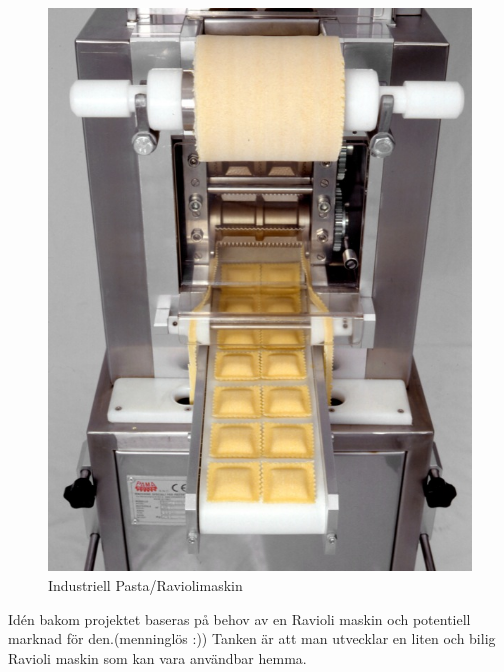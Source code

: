  		\begin{figure}[h]
 			\begin{center}
 				\includegraphics[scale=3]{images/pastamachine.jpg}
 				\caption{Industriell Pasta/Raviolimaskin}
 				\label{pastamaskin}	
 			\end{center}
 		\end{figure}

Idén bakom projektet baseras på behov av en Ravioli maskin och potentiell marknad för den.(menninglös :)) Tanken är att man utvecklar en liten och bilig Ravioli maskin som kan vara användbar hemma.		